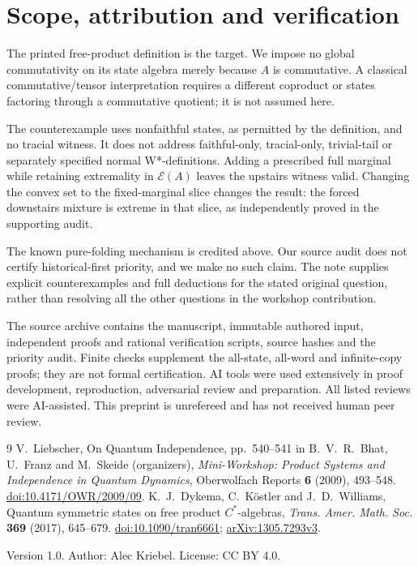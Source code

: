 \documentclass[10pt]{article}
\newcommand{\E}{\mathcal E}
\begin{document}
\section{Scope, attribution and verification}
The printed free-product definition is the target. We impose no
global commutativity on its state algebra merely because \(A\)
is commutative. A classical commutative/tensor interpretation
requires a different coproduct or states factoring through a
commutative quotient; it is not assumed here.

The counterexample uses nonfaithful states, as permitted by the
definition, and no tracial witness. It does not address faithful-only,
tracial-only, trivial-tail or separately specified normal W*-definitions.
Adding a prescribed full marginal while retaining extremality in
\(\E(A)\) leaves the upstairs witness valid. Changing the convex
set to the fixed-marginal slice changes the result: the forced
downstairs mixture is extreme in that slice, as independently proved
in the supporting audit.

The known pure-folding mechanism is credited above. Our source audit
does not certify historical-first priority, and we make no such claim.
The note supplies explicit counterexamples and full deductions for
the stated original question, rather than resolving all the other
questions in the workshop contribution.

The source archive contains the manuscript, immutable authored input,
independent proofs and rational verification scripts, source hashes
and the priority audit. Finite checks supplement the all-state,
all-word and infinite-copy proofs; they are not formal certification.
AI tools were used extensively in proof development, reproduction,
adversarial review and preparation. All listed reviews were AI-assisted.
This preprint is unrefereed and has not received human peer review.

\begin{thebibliography}{9}
V.~Liebscher, On Quantum Independence, pp.~540--541 in
B.~V.~R.~Bhat, U.~Franz and M.~Skeide (organizers),
\emph{Mini-Workshop: Product Systems and Independence in Quantum Dynamics},
Oberwolfach Reports \textbf{6} (2009), 493--548.
\href{https://doi.org/10.4171/OWR/2009/09}{doi:10.4171/OWR/2009/09}.
K.~J.~Dykema, C.~K\"ostler and J.~D.~Williams,
Quantum symmetric states on free product \(C^*\)-algebras,
\emph{Trans. Amer. Math. Soc.} \textbf{369} (2017), 645--679.
\href{https://doi.org/10.1090/tran6661}{doi:10.1090/tran6661};
\href{https://arxiv.org/abs/1305.7293v3}{arXiv:1305.7293v3}.
\end{thebibliography}
\smallskip\noindent\small
Version 1.0. Author: Alec Kriebel. License: CC BY 4.0.
\end{document}
